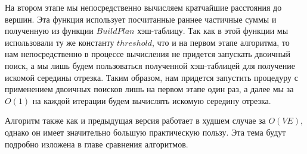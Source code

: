 На втором этапе мы непосредственно вычисляем кратчайшие расстояния до вершин. Эта функция использует посчитанные раннее частичные суммы и полученную из функции $BuildPlan$ хэш-таблицу. Так как в этой функции мы использовали ту же константу $threshold$, что и на первом этапе алгоритма, то нам непосредственно в процессе вычисления не придется запускать двоичный поиск, а мы лишь будем пользоваться полученной хэш-таблицей для получение искомой середины отрезка. Таким образом, нам придется запустить процедуру с применением двоичных поисков лишь на первом этапе один раз, а далее мы за $O(1)$ на каждой итерации будем вычислять искомую середину отрезка. 

Алгоритм также как и предыдущая версия работает в худшем случае за $O(VE)$, однако он имеет значительно большую практическую пользу. Эта тема будут подробно изложена в главе сравнения алгоритмов.
\FloatBarrier
